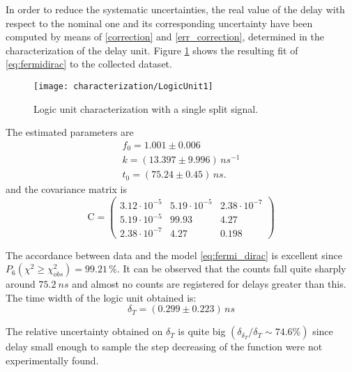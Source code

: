In order to reduce the systematic uncertainties, the real value of the delay with respect to the nominal one and its corresponding uncertainty have been computed by means of \eqref{correction} and \eqref{err_correction}, determined in the characterization of the delay unit.
Figure \ref{fig:fit_1scinti} shows the resulting fit of \eqref{eq:fermidirac} to the collected dataset. 
\begin{figure}[!htp]
	\centering
	\texttt{[image: characterization/LogicUnit1]}
	\caption{Logic unit characterization with a single split signal.} \label{fig:fit_1scinti}
\end{figure}
The estimated parameters are
\begin{equation}
\begin{array}{l}
f_0 = 1.001 \pm 0.006 \\
k = ( 13.397 \pm 9.996 ) \,  \si{ns^{-1}} \\
t_0 = ( 75.24 \pm 0.45 ) \,  \si{ns} .
\end{array}
\end{equation}
and the covariance matrix is
\begin{equation}
\textrm{C}=\left(
\begin{array}{ccc}
     3.12 \cdot 10^{-5}  &  5.19 \cdot 10^{-5}  &  2.38 \cdot 10^{-7} \\
    5.19 \cdot 10^{-5} &      99.93   &      4.27\\
    2.38 \cdot 10^{-7}  &       4.27   &    0.198
\end{array}
\right)
\end{equation}

The accordance between data and the model \eqref{eq:fermi_dirac} is excellent since
$P_6\left(\chi^2\geq\chi_{obs}^2\right)=99.21\,\%$.
It can be observed that the counts fall quite sharply around $\SI{75.2}{ns}$ and almost no counts are registered for delays greater than this.
The time width of the logic unit obtained is:
\begin{equation}
\delta_T = ( 0.299 \pm 0.223) \, \si{ns}
\end{equation}

The relative uncertainty obtained on $\delta_T$ is quite big $\left( \delta_{\delta_T} / \delta_T \sim 74.6 \%\right)$ since delay small enough to sample the step decreasing of the function were not experimentally found.\\

